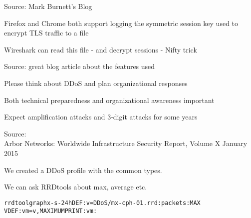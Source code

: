 \documentclass[20pt,landscape,a4paper,footrule]{foils}
\begin{document}
Source: Mark Burnett's Blog\\




\begin{list1}
\item  Firefox and Chrome both support logging the symmetric session key used to encrypt TLS traffic to a file
\item Wireshark can read this file - and decrypt sessions - Nifty trick
\end{list1}


Source: great blog article about the features used\\
{\tiny{}}




\begin{list1}
\item Please think about DDoS and plan organizational responses
\item Both technical preparedness and organizational awareness important
\end{list1}




\centerline{Expect amplification attacks and 3-digit attacks for some years}

Source:\\
Arbor Networks: Worldwide Infrastructure Security Report, Volume X January 2015




We created a DDoS profile with the common types.

We can ask RRDtools about max, average etc.
\begin{alltt}\small
rrdtool graph x -s -24h DEF:v=DDoS/mx-cph-01.rrd:packets:MAX
VDEF:vm=v,MAXIMUM PRINT:vm:%.lf
\end{alltt}




\end{document}
